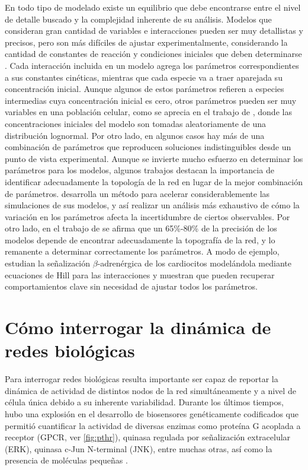 En todo tipo de modelado existe un equilibrio que debe encontrarse entre el nivel de detalle buscado y la complejidad inherente de su análisis. Modelos que consideran gran cantidad de variables e interacciones pueden ser muy detallistas y precisos, pero son más difíciles de ajustar experimentalmente, considerando la cantidad de constantes de reacción y condiciones iniciales que deben determinarse \citep{Sorger2011}. Cada interacción incluida en un modelo agrega los parámetros correspondientes a sus constantes cinéticas, mientras que cada especie va a traer aparejada su concentración inicial. Aunque algunos de estos parámetros refieren a especies intermedias cuya concentración inicial es cero, otros parámetros pueden ser muy variables en una población celular, como se aprecia en el trabajo de \cite{Spencer2009}, donde las concentraciones iniciales del modelo son tomadas aleatoriamente de una distribución lognormal. Por otro lado, en algunos casos hay más de una combinación de parámetros que reproducen soluciones indistinguibles desde un punto de vista experimental. Aunque se invierte mucho esfuerzo en determinar los parámetros para los modelos, algunos trabajos destacan la importancia de identificar adecuadamente la topología de la red en lugar de la mejor combinación de parámetros. \cite{Frohlich2018} desarrolla un método para acelerar considerablemente las simulaciones de sus modelos, y así realizar un análisis más exhaustivo de cómo la variación en los parámetros afecta la incertidumbre de ciertos observables. Por otro lado, en el trabajo de \cite{Santolini2018} se afirma que un 65\%-80\% de la precisión de los modelos depende de encontrar adecuadamente la topografía de la red, y lo remanente a determinar correctamente los parámetros. A modo de ejemplo, \cite{Kraeutler2010} estudian la señalización $\beta$-adrenérgica de los cardiocitos modelándola mediante ecuaciones de Hill para las interacciones y muestran que pueden recuperar comportamientos clave sin necesidad de ajustar todos los parámetros.


\section{Cómo interrogar la dinámica de redes biológicas}


Para interrogar redes biológicas resulta importante ser capaz de reportar la dinámica de actividad de distintos nodos de la red simultáneamente y a nivel de célula única debido a su inherente variabilidad. Durante los últimos tiempos, hubo una explosión en el desarrollo de biosensores genéticamente codificados que permitió cuantificar la actividad de diversas enzimas como proteína G acoplada a receptor (GPCR, ver \cref{fig:pthr}), quinasa regulada por señalización extracelular (ERK), quinasa c-Jun N-terminal (JNK), entre muchas otras, así como la presencia de moléculas pequeñas \citep{Greenwald2018}.

